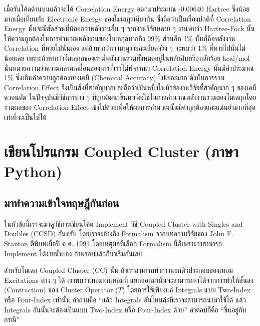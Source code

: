 \noindent เมื่อรันโค้ดด้านบนแล้วจะได้ Correlation Energy ออกมาประมาณ -0.00640 Hartree ซึ่งน้อยมากเมื่อเทียบกับ Electronic
Energy ของโมเลกุลเดียวกัน ซึ่งถือว่าเป็นเรื่องปกติที่ Correlation Energy นั้นจะมีสัดส่วนที่น้อยกว่าพลังงานอื่น ๆ จากงานวิจัยหลาย ๆ งานพบว่า
Hartree-Fock นั้นให้ความถูกต้องในการคำนวณพลังงานของโมเลกุลมากถึง 99\% ส่วนอีก 1\% นั้นก็คือพลังงาน Correlation ที่หายไปนั่นเอง
แต่ถ้าหากว่าเรามาดูรายละเอียดจริง ๆ จะพบว่า 1\% ที่หายไปนั้นไม่น้อยเลย เพราะถ้าหากว่าโมเลกุลของเรามีพลังงานรวมทั้งหมดอยู่ในหลักสิบหรือหลักร้อย
kcal/mol นั่นหมายความว่าความคลาดเคลื่อนของการที่เราไม่พิจารณา Correlation Energy นั้นมีค่าประมาณ 1\% ซึ่งเกินค่าความถูกต้องทางเคมี
(Chemical Accuracy) ไปเยอะมาก ดังนั้นการรวม Correlation Effect จึงเป็นสิ่งที่สำคัญมากและถือว่าเป็นหนึ่งในหัวข้องานวิจัยที่สำคัญมาก ๆ
ของเคมีควอนตัม ในปัจจุบันมีวิธีการต่าง ๆ ที่ถูกพัฒนาขึ้นมาเพื่อใช้ในการคำนวณพลังงานรวมของโมเลกุลโดยรวมผลของ Correlation Effect
เข้าไปด้วยเพื่อให้ผลการคำนวณนั้นมีค่าถูกต้องและแม่นยำมากที่สุดเท่าที่จะเป็นไปได้

\section{เขียนโปรแกรม Coupled Cluster (ภาษา Python)}

\subsection{มาทำความเข้าใจทฤษฎีกันก่อน}

ในหัวข้อนี้เราจะมาดูวิธีการเขียนโค้ด Implement วิธี Coupled Cluster with Singles and Doubles (CCSD) กันครับ โดยเราจะอ้างอิง
Formalism จากบทความวิจัยของ John F. Stanton ตีพิมพ์เมื่อปี ค.ศ. 1991\autocite{stanton1991} โดยเหตุผลที่เลือก Formalism
นี้ก็เพราะว่าสามารถ Implement ได้ง่ายนั่นเอง ถ้าพร้อมแล้วก็มาเริ่มกันเลย

สำหรับโมเดล Coupled Cluster (CC) นั้น ถ้าเราสามารถทำการแยกตัวประกอบของเทอม Excitations ต่าง ๆ ได้ เราพบว่าเทอมทุกเทอมที่%
แยกออกมานั้นจะสามารถหาได้จากการทำให้สั้นลง (Contraction) ของ Cluster Operator ($T$) โดยการใช้เพียงแค่ Integrals แบบ
Two-Index หรือ Four-Index เท่านั้น คำถามคือ \enquote{แล้ว Integrals อันไหนล่ะที่เราจะสามารถนำมาใช้ได้ แล้ว Integrals
  อันนั้นจะต้องเป็นแบบ Two-Index หรือ Four-Index ด้วย} คำตอบก็คือ \enquote{ขึ้นอยู่กับกรณี}

